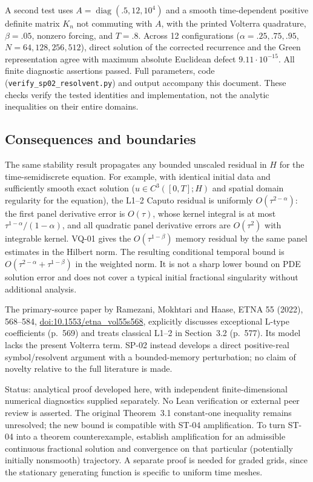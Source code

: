 \documentclass[11pt,a4paper]{amsart}
\theoremstyle{remark}
\theoremstyle{plain}
\theoremstyle{remark}
\numberwithin{equation}{section}
\begin{document}
A second test uses $A=\operatorname{diag}(.5,12,10^4)$ and a smooth time-dependent positive definite matrix $K_n$ not commuting with $A$, with the printed Volterra quadrature, $\beta=.05$, nonzero forcing, and $T=.8$. Across 12 configurations ($\alpha=.25,.75,.95$, $N=64,128,256,512$), direct solution of the corrected recurrence and the Green representation agree with maximum absolute Euclidean defect $9.11\cdot10^{-15}$. All finite diagnostic assertions passed. Full parameters, code (\texttt{verify\_sp02\_resolvent.py}) and output accompany this document. These checks verify the tested identities and implementation, not the analytic inequalities on their entire domains.

\subsection{Consequences and boundaries}
The same stability result propagates any bounded unscaled residual in $H$ for the time-semidiscrete equation. For example, with identical initial data and sufficiently smooth exact solution ($u\in C^3([0,T];H)$ and spatial domain regularity for the equation), the L1--2 Caputo residual is uniformly $O(\tau^{2-\alpha})$: the first panel derivative error is $O(\tau)$, whose kernel integral is at most $\tau^{1-\alpha}/(1-\alpha)$, and all quadratic panel derivative errors are $O(\tau^2)$ with integrable kernel. VQ-01 gives the $O(\tau^{1-\beta})$ memory residual by the same panel estimates in the Hilbert norm. The resulting conditional temporal bound is $O(\tau^{2-\alpha}+\tau^{1-\beta})$ in the weighted norm. It is not a sharp lower bound on PDE solution error and does not cover a typical initial fractional singularity without additional analysis.

The primary-source paper by Ramezani, Mokhtari and Haase, ETNA 55 (2022), 568--584, \href{https://doi.org/10.1553/etna_vol55s568}{doi:10.1553/etna\_vol55s568}, explicitly discusses exceptional L-type coefficients (p.~569) and treats classical L1--2 in Section~3.2 (p.~577). Its model lacks the present Volterra term. SP-02 instead develops a direct positive-real symbol/resolvent argument with a bounded-memory perturbation; no claim of novelty relative to the full literature is made.

Status: analytical proof developed here, with independent finite-dimensional numerical diagnostics supplied separately. No Lean verification or external peer review is asserted. The original Theorem~3.1 constant-one inequality remains unresolved; the new bound is compatible with ST-04 amplification. To turn ST-04 into a theorem counterexample, establish amplification for an admissible continuous fractional solution and convergence on that particular (potentially initially nonsmooth) trajectory. A separate proof is needed for graded grids, since the stationary generating function is specific to uniform time meshes.
\end{document}
